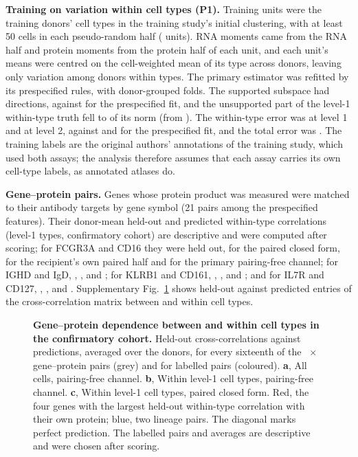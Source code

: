 \textbf{Training on variation within cell types (P1).} Training units were the
training donors' cell types in the training study's initial clustering, with at least 50 cells in each
pseudo-random half (\XsPoneUnits{} units). RNA moments came from the RNA half and
protein moments from the protein half of each unit, and each unit's means were
centred on the cell-weighted mean of its type across donors, leaving only
variation among donors within types. The primary estimator was refitted by its
prespecified rules, with donor-grouped folds. The supported subspace had \XsPoneDim{}
directions, against \XsDimM{} for the prespecified fit, and the unsupported part of
the level-1 within-type truth fell to \XsPoneFloor{} of its norm (from
\XsHaoWIdFloor). The within-type error was \XsPoneErr{} at level 1 and
\XsPoneErrLTwo{} at level 2, against \XsHaoWErrPfMeans{} and
\XsHaoLTwoErrPfMeans{} for the prespecified fit, and the total error was
\XsPoneErrTotal. The training labels are the original authors' annotations of
the training study, which used both assays; the analysis therefore assumes
that each assay carries its own cell-type labels, as annotated atlases do.

\textbf{Gene--protein pairs.} Genes whose protein product was measured were
matched to their antibody targets by gene symbol (21 pairs among the prespecified
features). Their donor-mean held-out and predicted within-type correlations
(level-1 types, confirmatory cohort) are descriptive and were computed after
scoring; for FCGR3A and CD16 they were \XsPairFcgraWTruth{} held out,
\XsPairFcgraWPaired{} for the paired closed form, \XsPairFcgraWBench{} for the
recipient's own paired half and \XsPairFcgraWPfMeans{} for the primary
pairing-free channel; for IGHD and IgD, \XsPairIghdWTruth, \XsPairIghdWPaired,
\XsPairIghdWBench{} and \XsPairIghdWPfMeans; for KLRB1 and CD161,
\XsPairKlrbWTruth, \XsPairKlrbWPaired, \XsPairKlrbWBench{} and
\XsPairKlrbWPfMeans; and for IL7R and CD127, \XsPairIlrWTruth,
\XsPairIlrWPaired, \XsPairIlrWBench{} and \XsPairIlrWPfMeans. Supplementary Fig.~\ref{sfig:entries} shows held-out against
predicted entries of the cross-correlation matrix between and within cell types.

\begin{figure}[htbp]
\centering
\resizebox{\textwidth}{!}{}
\caption{\textbf{Gene--protein dependence between and within cell types in the confirmatory cohort.}
Held-out cross-correlations against predictions, averaged over the \XsHaoDonors{} donors, for every sixteenth of the \XsGenes{}~$\times$~\XsProteins{} gene--protein pairs (grey) and for labelled pairs (coloured). \textbf{a}, All cells, pairing-free channel. \textbf{b}, Within level-1 cell types, pairing-free channel. \textbf{c}, Within level-1 cell types, paired closed form. Red, the four genes with the largest held-out within-type correlation with their own protein; blue, two lineage pairs. The diagonal marks perfect prediction. The labelled pairs and averages are descriptive and were chosen after scoring.}
\label{sfig:entries}
\end{figure}

